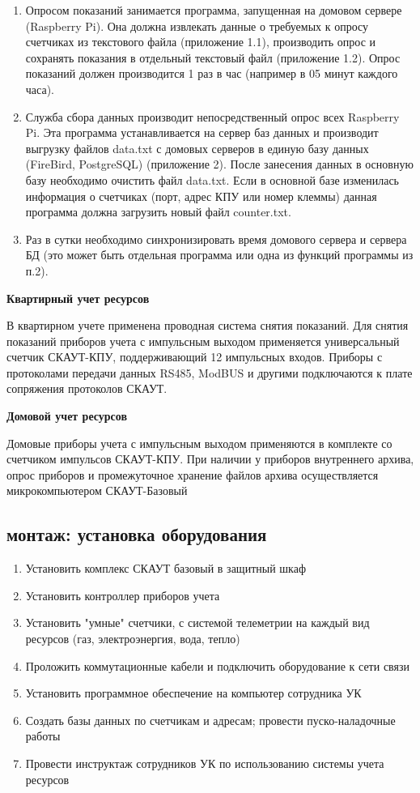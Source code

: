 \begin{enumerate}
	\item Опросом показаний занимается программа, запущенная на домовом сервере (Raspberry Pi).  Она должна извлекать данные о требуемых к опросу счетчиках из текстового файла (приложение 1.1), производить опрос и сохранять показания в отдельный текстовый файл (приложение 1.2). Опрос показаний должен производится 1 раз  в час (например в 05 минут каждого часа).
	\item Служба сбора данных производит непосредственный опрос всех Raspberry Pi. Эта программа устанавливается на сервер баз данных и производит выгрузку файлов data.txt  с домовых серверов в единую базу данных (FireBird, PostgreSQL) (приложение 2). После занесения данных в основную базу необходимо очистить файл data.txt.  Если в основной базе изменилась информация о счетчиках (порт, адрес КПУ или номер клеммы) данная программа должна загрузить новый файл counter.txt.
	\item Раз в сутки необходимо синхронизировать время домового сервера и сервера БД (это может быть отдельная программа или одна из функций программы из п.2).	
\end{enumerate}

\textbf{Квартирный учет ресурсов}

В квартирном учете применена проводная система снятия показаний. Для снятия показаний приборов учета с импульсным выходом применяется универсальный счетчик СКАУТ-КПУ, поддерживающий 12 импульсных входов. Приборы с протоколами передачи данных RS485, ModBUS и другими подключаются к плате сопряжения протоколов СКАУТ.

\textbf{Домовой учет ресурсов}

Домовые приборы учета с импульсным выходом применяются в комплекте со счетчиком импульсов СКАУТ-КПУ. При наличии у приборов внутреннего архива, опрос приборов и промежуточное хранение файлов архива осуществляется микрокомпьютером СКАУТ-Базовый

\subsection{монтаж: установка оборудования}

\begin{enumerate}
	\item Установить комплекс СКАУТ базовый в защитный шкаф
	\item Установить контроллер приборов учета
	\item Установить "умные" счетчики, с системой телеметрии на каждый вид ресурсов (газ, электроэнергия, вода, тепло)
	\item Проложить коммутационные кабели и подключить оборудование к сети связи
	\item Установить программное обеспечение на компьютер сотрудника УК
	\item Создать базы данных по счетчикам и адресам; провести пуско-наладочные работы
	\item Провести инструктаж сотрудников УК по использованию системы учета ресурсов
\end{enumerate}
